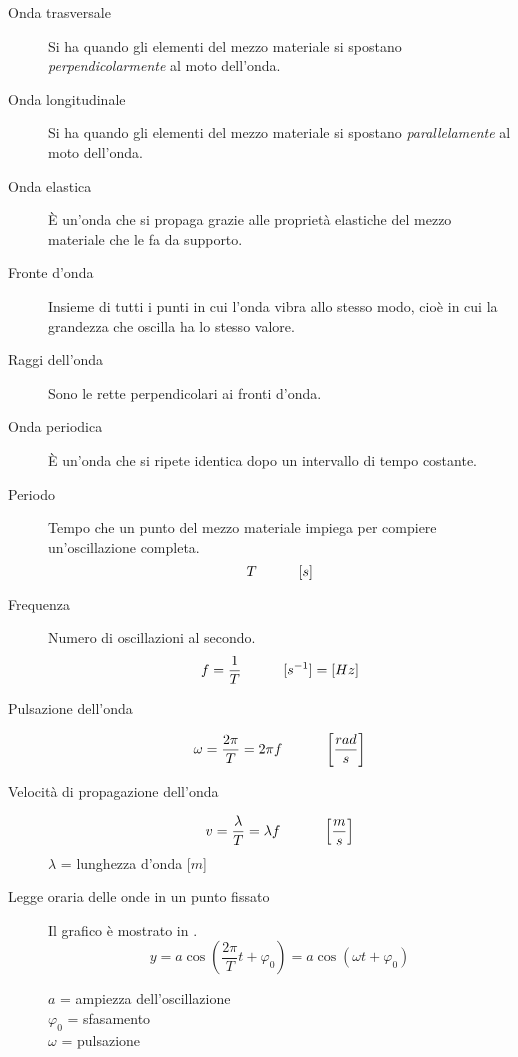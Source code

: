 \documentclass[a4paper,11pt,italian]{article}
\begin{document}
\begin{description}
  \item[Onda trasversale] 
  Si ha quando gli elementi del mezzo materiale si spostano \emph{perpendicolarmente} al moto dell'onda.
  
  \item[Onda longitudinale] 
  Si ha quando gli elementi del mezzo materiale si spostano \emph{parallelamente} al moto dell'onda.
  
  \item[Onda elastica] 
  È un'onda che si propaga grazie alle proprietà elastiche del mezzo materiale che le fa da supporto.
  
  \item[Fronte d'onda] 
  Insieme di tutti i punti in cui l'onda vibra allo stesso modo, cioè in cui la grandezza che oscilla ha lo stesso valore.
  
  \item[Raggi dell'onda] 
  Sono le rette perpendicolari ai fronti d'onda.
  
  \item[Onda periodica] 
  È un'onda che si ripete identica dopo un intervallo di tempo costante.
  
  \item[Periodo] 
  Tempo che un punto del mezzo materiale impiega per compiere un'oscillazione completa.
  \[ T \hspace*{3em} [s] \]
  
  \item[Frequenza] 
  Numero di oscillazioni al secondo.
  \[ f = \frac{1}{T} \hspace*{3em} [s^{-1}]=[ Hz] \]
  
  \item[Pulsazione dell'onda]
  \[ \omega = \frac{2\pi}{T} = 2\pi f \hspace*{3em} \left[ \frac{rad}{s} \right] \]
  
  \item[Velocità di propagazione dell'onda] 
  \[ v = \frac{\lambda}{T} = \lambda f \hspace*{3em} \left[ \frac{m}{s} \right] \]
  $ \lambda $ = lunghezza d'onda [$ m $]
  
  \item[Legge oraria delle onde in un punto fissato] 
  Il grafico è mostrato in .
  \[ y = a \cos\left(\frac{2 \pi}{T}t + \varphi_0\right) = a \cos\left(\omega t + \varphi_0\right) \]
  \begin{multicols}{2}
  $ a $ = ampiezza dell'oscillazione\\
  $ \varphi_0 $ = sfasamento\\
  $ \omega $ = pulsazione
  \end{multicols}
  

\end{description}
\end{document}
